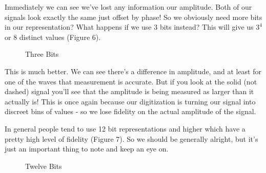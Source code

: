 \documentclass[10pt,a5paper]{book}
\begin{document}
Immediately we can see we've lost any information our amplitude. Both of our signals look exactly the same just offset by phase! So we obviously need more bits in our representation? What happens if we use 3 bits instead? This will give us $3^4$ or $8$ distinct values (Figure 6). 

\begin{figure}[!htb]
\caption{\label{fig:my-label} Three Bits}
\end{figure}

This is much better. We can see there's a difference in amplitude, and at least for one of the waves that measurement is accurate. But if you look at the solid (not dashed) signal you'll see that the amplitude is being measured as larger than it actually is! This is once again because our digitization is turning our signal into discreet bins of values - so we lose fidelity on the actual amplitude of the signal. 

In general people tend to use 12 bit representations and higher which have a pretty high level of fidelity (Figure 7). So we should be generally alright, but it's just an important thing to note and keep an eye on. 

\begin{figure}[!htb]
\caption{\label{fig:my-label} Twelve Bits}
\end{figure}
\end{document}
